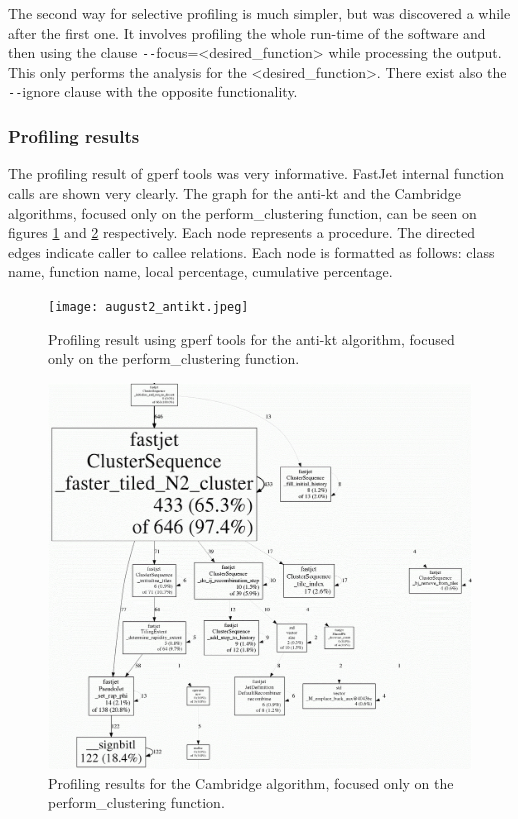 The second way for selective profiling is much simpler, but was discovered a while after the first one. It involves profiling the whole run-time of the software and then using the clause \verb|--|focus=<desired\_function> while processing the output. This only performs the analysis for the <desired\_function>. There exist also the \verb|--|ignore clause with the opposite functionality.

\subsubsection{Profiling results} 
The profiling result of gperf tools was very informative. FastJet internal function calls are shown very clearly. The graph for the anti-kt and the Cambridge algorithms, focused only on the perform\_clustering function, can be seen on figures \ref{fig:gperfnatikt} and \ref{fig:gperfcamb} respectively. Each node represents a procedure. The directed edges indicate caller to callee relations. Each node is formatted as follows: class name, function name, local percentage, cumulative percentage.

\begin{figure}[H]
    \centering
\texttt{[image: august2\_antikt.jpeg]}
    \caption{Profiling result using gperf tools for the anti-kt algorithm, focused only on the perform\_clustering function.}
    \label{fig:gperfnatikt}
\end{figure}

\begin{figure}[H]
    \centering
\includegraphics[width=1\linewidth]{images/august2_camb.jpg}
    \caption{Profiling results for the Cambridge algorithm, focused only on the perform\_clustering function.}
    \label{fig:gperfcamb}
\end{figure}

